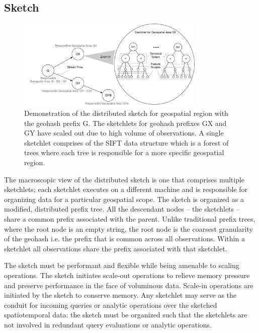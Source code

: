 \subsection{Sketch}
\begin{figure}
    \centerline{\includegraphics[width=0.8\textwidth]{figures/dist-sketch.pdf}}
    \caption{Demonstration of the distributed sketch for geospatial region with the geohash prefix G. The sketchlets for geohash prefixes GX and GY have scaled out due to high volume of observations. A single sketchlet comprises of the SIFT data structure which is a forest of trees where each tree is responsible for a more specific geospatial region.}
    \label{fig:dist-sketch}
\end{figure}

The macroscopic view of the distributed sketch is one that comprises multiple sketchlets; each sketchlet executes on a different machine and is responsible for organizing data for a particular geospatial scope. The sketch is organized as a modified, distributed prefix tree. All the descendant nodes -- the sketchlets -- share a common prefix associated with the parent. Unlike traditional prefix trees, where the root node is an empty string, the root node is the coarsest granularity of the geohash i.e. the prefix that is common across all observations. Within a sketchlet all observations share the prefix associated with that sketchlet.

The sketch must be performant and flexible while being amenable to scaling operations. The sketch initiates scale-out operations to relieve memory pressure and preserve performance in the face of voluminous data. Scale-in operations are initiated by the sketch to conserve memory. Any sketchlet may serve as the conduit for incoming queries or analytic operations over the sketched spatiotemporal data: the sketch must be organized such that the sketchlets are not involved in redundant query evaluations or analytic operations. 

